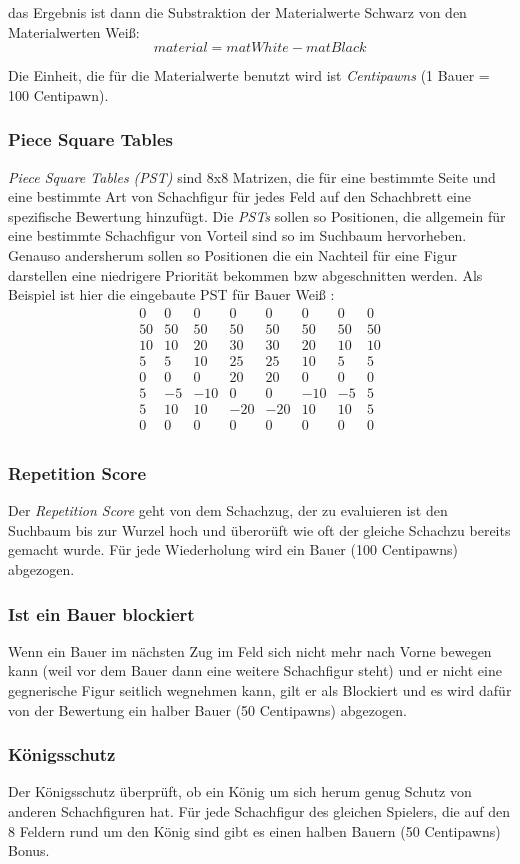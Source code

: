 das Ergebnis ist dann die Substraktion der Materialwerte Schwarz von den Materialwerten Weiß: 
$$
material = matWhite - matBlack
$$

Die Einheit, die f\"ur die Materialwerte benutzt wird ist \textit{Centipawns} (1 Bauer = 100 Centipawn).

\subsubsection{Piece Square Tables}
\textit{Piece Square Tables (PST)} sind  8x8 Matrizen, die für eine bestimmte Seite und eine bestimmte Art von Schachfigur für jedes Feld auf den Schachbrett eine spezifische Bewertung hinzuf\"ugt.
Die \textit{PSTs} sollen so Positionen, die allgemein f\"ur eine bestimmte Schachfigur von Vorteil sind so im Suchbaum hervorheben. Genauso andersherum sollen so Positionen die ein Nachteil f\"ur eine Figur darstellen eine niedrigere Priorit\"at bekommen bzw abgeschnitten werden.
\newline Als Beispiel ist hier die eingebaute PST für Bauer Weiß : 
$$
\begin{matrix}
         0 &  0 &  0 &  0 &  0 &  0 &  0 &  0 \\
        50 & 50 & 50 & 50 & 50 & 50 & 50 & 50 \\
        10 & 10 & 20 & 30 & 30 & 20 & 10 & 10 \\
         5 &  5 & 10 & 25 & 25 & 10 &  5 &  5 \\
         0 &  0 &  0 & 20 & 20 &  0 &  0 &  0 \\
         5 & -5 &-10 &  0 &  0 &-10 & -5 &  5 \\
         5 & 10 & 10 &-20 &-20 & 10 & 10 &  5 \\
         0 &  0 &  0 &  0 &  0 &  0 &  0 &  0 \\
\end{matrix}
$$

\subsubsection{Repetition Score}
Der \textit{Repetition Score} geht von dem Schachzug, der zu evaluieren ist den Suchbaum bis zur Wurzel hoch und \"uberor\"uft wie oft der gleiche Schachzu bereits gemacht wurde. F\"ur jede Wiederholung wird ein Bauer (100 Centipawns) abgezogen.
\subsubsection{Ist ein Bauer blockiert}
Wenn ein Bauer im nächsten Zug im Feld sich nicht mehr nach Vorne bewegen kann (weil vor dem Bauer dann eine weitere Schachfigur steht) und er nicht eine gegnerische Figur seitlich wegnehmen kann, gilt er als Blockiert und es wird dafür von der Bewertung ein halber Bauer (50 Centipawns) abgezogen.

\subsubsection{Königsschutz}
Der Königsschutz überprüft, ob ein König um sich herum genug Schutz von anderen Schachfiguren hat.\newline
F\"ur jede Schachfigur des gleichen Spielers, die auf den 8 Feldern rund um den K\"onig sind gibt es einen halben Bauern (50 Centipawns) Bonus.
